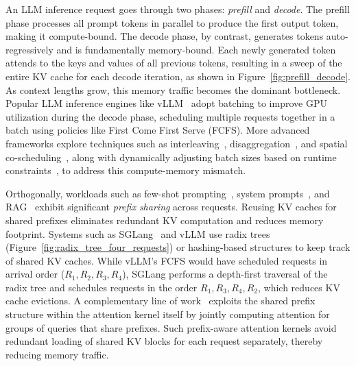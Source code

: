 An LLM inference request goes through two phases: \textit{prefill} and \textit{decode}. The prefill phase processes all prompt tokens in parallel to produce the first output token, making it compute-bound. The decode phase, by contrast, generates tokens auto-regressively and is fundamentally memory-bound. 
Each newly generated token attends to the keys and values of all previous tokens, resulting in a sweep of the entire KV cache for each decode iteration, as shown in Figure~\ref{fig:prefill_decode}. As context lengths grow, this memory traffic becomes the dominant bottleneck. 
Popular LLM inference engines like vLLM~\cite{kwon2023efficient} adopt batching to improve GPU utilization during the decode phase, scheduling multiple requests together in a batch using policies like First Come First Serve (FCFS). More advanced frameworks explore techniques such as interleaving~\cite{agrawal2024tamingthroughputlatencytradeoffllm}, disaggregation~\cite{zhong2024distservedisaggregatingprefilldecoding}, and spatial co-scheduling~\cite{Kamath_2025,lin2025boostingllmservingspatialtemporal}, along with dynamically adjusting batch sizes based on runtime constraints~\cite{pang2025optimizing}, to address this compute-memory mismatch. 

Orthogonally, workloads such as few-shot prompting~\cite{brown2020languagemodelsfewshotlearners,NEURIPS2021_5c049256}, system prompts~\cite{thebigpromptlibrary}, and RAG~\cite{lewis2021retrievalaugmentedgenerationknowledgeintensivenlp} exhibit significant \textit{prefix sharing} across requests. Reusing KV caches for shared prefixes eliminates redundant KV computation and reduces memory footprint. Systems such as SGLang~\cite{zheng2024sglangefficientexecutionstructured} and vLLM \cite{kwon2023efficient} use radix trees (Figure~\ref{fig:radix_tree_four_requests}) or hashing-based structures to keep track of shared KV caches. While vLLM's FCFS would have scheduled requests in arrival order ($R_1, R_2, R_3, R_4$), SGLang performs a depth-first traversal of the radix tree and schedules requests in the order $R_1, R_3, R_4, R_2$, which reduces KV cache evictions.
A complementary line of work~\cite{yi2026pat,yao2025deftdecodingflashtreeattention,ye2024chunkattentionefficientselfattentionprefixaware,MLSYS2025_96894468} exploits the shared prefix structure within the attention kernel itself by jointly computing attention for groups of queries that share prefixes. Such prefix-aware attention kernels avoid redundant loading of shared KV blocks for each request separately, thereby reducing memory traffic. 

